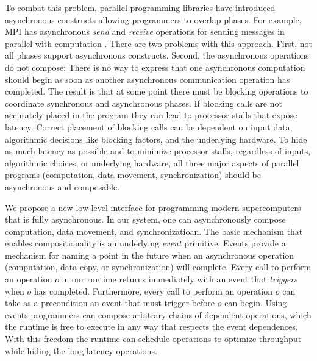 To combat this problem, parallel programming libraries have introduced
asynchronous constructs allowing programmers to overlap phases.  For
example, MPI has asynchronous {\em send} and {\em receive} operations
for sending messages in parallel with computation \cite{MPI}.  There
are two problems with this approach.  First, not all phases support
asynchronous constructs.  Second, the asynchronous operations do not
compose: There is no way to express that one asynchronous computation
should begin as soon as another asynchronous communication operation
has completed.  The result is that at some point there must be
blocking operations to coordinate synchronous and asynchronous phases.
If blocking calls are not accurately placed in the program they can
lead to processor stalls that expose latency.  Correct placement of
blocking calls can be dependent on input data, algorithmic decisions
like blocking factors, and the underlying hardware.  To hide as much
latency as possible and to minimize processor stalls, regardless of
inputs, algorithmic choices, or underlying hardware, all three major
aspects of parallel programs (computation, data movement,
synchronization) should be asynchronous and composable.

We propose a new low-level interface for programming modern
supercomputers that is fully asynchronous. In our system, one can
asynchronously compose computation, data movement, and
synchronizatioan.  The basic mechanism that enables compositionality
is an underlying {\em event} primitive.  Events provide a mechanism
for naming a point in the future when an asynchronous operation
(computation, data copy, or synchronization) will complete.  Every
call to perform an operation $o$ in our runtime returns immediately
with an event that {\em triggers} when $o$ has completed.
Furthermore, every call to perform an operation $o$ can take as a
precondition an event that must trigger before $o$ can begin.  Using
events programmers can compose arbitrary chains of dependent
operations, which the runtime is free to execute in any way that
respects the event dependences.  With this freedom the runtime can
schedule operations to optimize throughput while hiding the long
latency operations.

